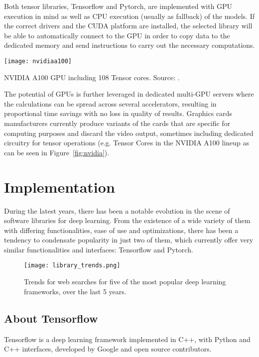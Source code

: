 Both tensor libraries, Tensorflow and Pytorch, are implemented with GPU execution in mind as well as CPU execution (usually as fallback) of the models. If the correct drivers and the CUDA platform are installed, the selected library will be able to automatically connect to the GPU in order to copy data to the dedicated memory and send instructions to carry out the necessary computations.

\begin{marginfigure}
    \texttt{[image: nvidiaa100]}
    \caption{\label{fig:nvidia}NVIDIA A100 GPU including 108 Tensor cores. Source: \cite{nvidiaa100}.}
\end{marginfigure}
 
The potential of GPUs is further leveraged in dedicated multi-GPU servers where the calculations can be spread across several accelerators, resulting in proportional time savings with no loss in quality of results. Graphics cards manufacturers currently produce variants of the cards that are specific for computing purposes and discard the video output, sometimes including dedicated circuitry for tensor operations (e.g. Tensor Cores in the NVIDIA A100 lineup  as can be seen in Figure~\ref{fig:nvidia}).

\section{Implementation}

During the latest years, there has been a notable evolution in the scene of software libraries for deep learning. From the existence of a wide variety of them with differing functionalities, ease of use and optimizations, there has been a tendency to condensate popularity in just two of them, which currently offer very similar functionalities and interfaces: Tensorflow and Pytorch.

\begin{figure*}[htbp]
    \centering  
    \texttt{[image: library\_trends.png]}
    \caption{Trends for web searches for five of the most popular deep learning frameworks, over the last 5 years.}
    \label{fig:trends}
\end{figure*}

\subsection{About Tensorflow}

Tensorflow is a deep learning framework implemented in C++, with Python and C++ interfaces, developed by Google and open source contributors.

